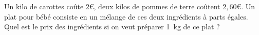 
\begin{exercice}\label{exo2smath-0250}

    Un kilo de carottes coûte $2$€, deux kilos de pommes de terre coûtent $2,60$€. Un plat pour bébé consiste en un mélange de ces deux ingrédients à parts égales. Quel est le prix des ingrédients si on veut préparer \SI{1}{\kilo\gram} de ce plat ?

\end{exercice}
